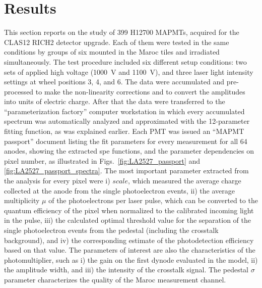 \section{Results}

This section reports on the study of 399 H12700 MAPMTs, acquired for the CLAS12 RICH2 detector upgrade. Each of them were tested in the same conditions by groups of six mounted in the Maroc tiles and irradiated simultaneously. The test procedure included six different setup conditions: two sets of applied high voltage (1000~V and 1100~V), and three laser light intensity settings at wheel positions 3, 4, and 6. The data were accumulated and pre-processed to make the non-linearity corrections and to convert the amplitudes into units of electric charge. After that the data were transferred to the ``parameterization factory'' computer workstation in which every accumulated spectrum was automatically analyzed and approximated with the 12-parameter fitting function, as was explained earlier. Each PMT was issued an ``MAPMT passport'' document listing the fit parameters for every measurement for all 64 anodes, showing the extracted spe functions, and the parameter dependencies on pixel number, as illustrated in Figs.~\ref{fig:LA2527_passport} and \ref{fig:LA2527_passport_spectra}. The most important parameter extracted from the analysis for every pixel were i) $scale$, which measured the average charge collected at the anode from the single photoelectron events, ii) the average multiplicity $\mu$ of the photoelectrons per laser pulse, which can be converted to the quantum efficiency of the pixel when normalized to the calibrated incoming light in the pulse, iii) the calculated optimal threshold value for the separation of the single photoelectron events from the pedestal (including the crosstalk background), and iv) the corresponding estimate of the photodetection efficiency based on that value. The parameters of interest are also the characteristics of the photomultiplier, such as i) the gain on the first dynode evaluated in the model, ii) the amplitude width, and iii) the intensity of the crosstalk signal. The pedestal $\sigma$ parameter characterizes the quality of the Maroc measurement channel.

